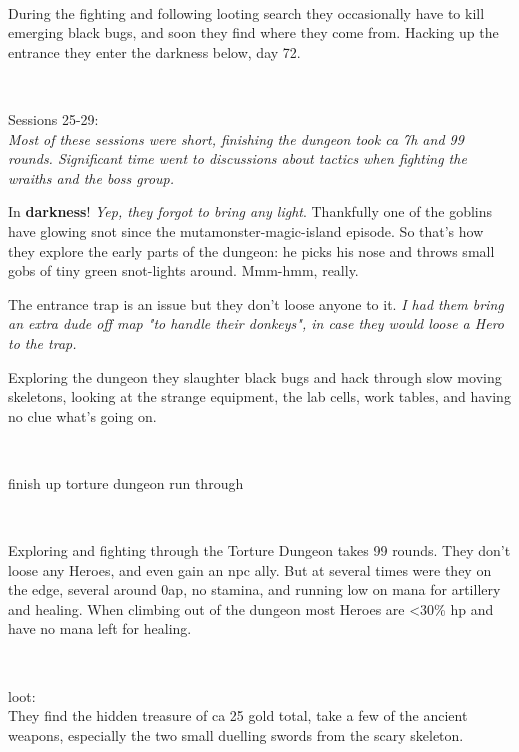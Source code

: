 \

During the fighting and following looting search they occasionally have to kill emerging black bugs, and soon they find where they come from. Hacking up the entrance they enter the darkness below, day 72.

\


Sessions 25-29:\\                                                       %
\emph{Most of these sessions were short, finishing the dungeon took ca 7h and 99 rounds. Significant time went to discussions about tactics when fighting the wraiths and the boss group.}

In \textbf{darkness}! \emph{Yep, they forgot to bring any light}. Thankfully one of the goblins have glowing snot since the mutamonster-magic-island episode. So that's how they explore the early parts of the dungeon: he picks his nose and throws small gobs of tiny green snot-lights around. Mmm-hmm, really.

The entrance trap is an issue but they don't loose anyone to it. \emph{I had them bring an extra dude off map "to handle their donkeys", in case they would loose a Hero to the trap.}

Exploring the dungeon they slaughter black bugs and hack through slow moving skeletons, looking at the strange equipment, the lab cells, work tables, and having no clue what's going on.

\

\todo finish up torture dungeon run through

\

Exploring and fighting through the Torture Dungeon takes 99 rounds. They don't loose any Heroes, and even gain an npc ally. But at several times were they on the edge, several around 0ap, no stamina, and running low on mana for artillery and healing. When climbing out of the dungeon most Heroes are <30\% hp and have no mana left for healing.

\

loot:\\
They find the hidden treasure of ca 25 gold total, take a few of the ancient weapons, especially the two small duelling swords from the scary skeleton.

